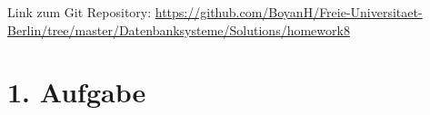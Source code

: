 \usepackage{graphicx}
\usepackage{fancyvrb}

\newcommand{\dozent}{Prof. Dr. Agn`es Voisard, Nicolas Lehmann}					%
\newcommand{\tutor}{Nicolas Lehmann}						%
\newcommand{\tutoriumNo}{10}				%
\newcommand{\projectNo}{8}									%
\newcommand{\veranstaltung}{Datenbanksysteme}	%
\newcommand{\semester}{SoSe 2017}						%
\newcommand{\studenten}{Boyan Hristov, Julian Habib}			%




Link zum Git Repository: \url{https://github.com/BoyanH/Freie-Universitaet-Berlin/tree/master/Datenbanksysteme/Solutions/homework\projectNo}


\section*{1. Aufgabe}

